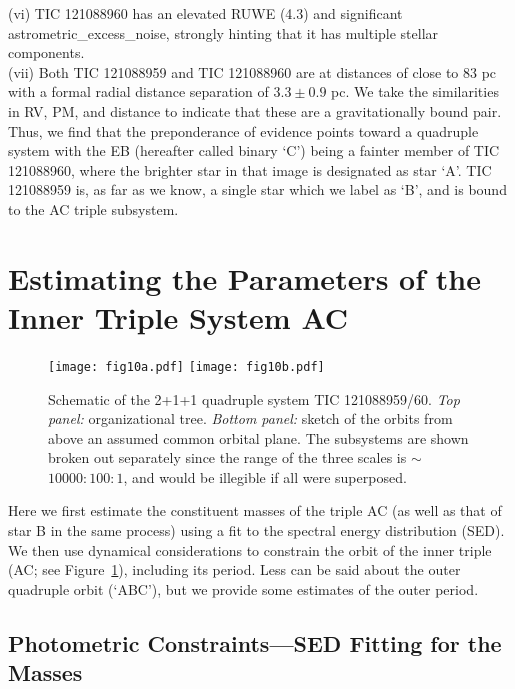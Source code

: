 \documentclass[fleqn,usenatbib]{mnras} %
\begin{document}
    \indent (vi) TIC 121088960 has an elevated RUWE (4.3) and significant astrometric\_excess\_noise, strongly hinting that it has multiple stellar components. \\
    \indent (vii) Both TIC 121088959 and TIC 121088960 are at distances of close to 83 pc with a formal radial distance separation of $3.3 \pm 0.9$ pc. We take the similarities in RV, PM, and distance to indicate that these are a gravitationally bound pair. \\

 Thus, we find that the preponderance of evidence points toward a quadruple system with the EB (hereafter called binary `C') being a fainter member of TIC 121088960, where the brighter star in that image is designated as star `A'.  TIC 121088959 is, as far as we know, a single star which we label as `B', and is bound to the AC triple subsystem.


\section{Estimating the Parameters of the Inner Triple System AC}
\label{sec:tripleorbit}

\begin{figure}
\centering
\texttt{[image: fig10a.pdf]} 
\texttt{[image: fig10b.pdf]}
\caption{Schematic of the 2+1+1 quadruple system TIC 121088959/60. {\em Top panel:} organizational tree.  {\em Bottom panel:} sketch of the orbits from above an assumed common orbital plane.  The subsystems are shown broken out separately since the range of the three scales is $\sim$$10000:100:1$, and would be illegible if all were superposed.}
\label{fig:schematic}
\end{figure}

Here we first estimate the constituent masses of the triple AC (as well as that of star B in the same process) using a fit to the spectral energy distribution (SED).  We then use dynamical considerations to constrain the orbit of the inner triple (AC; see Figure~\ref{fig:schematic}), including its period.  Less can be said about the outer quadruple orbit (`ABC'), but we provide some estimates of the outer period.

\subsection{Photometric Constraints---SED Fitting for the Masses}
\label{sec:PhotConstraints}
\end{document}
